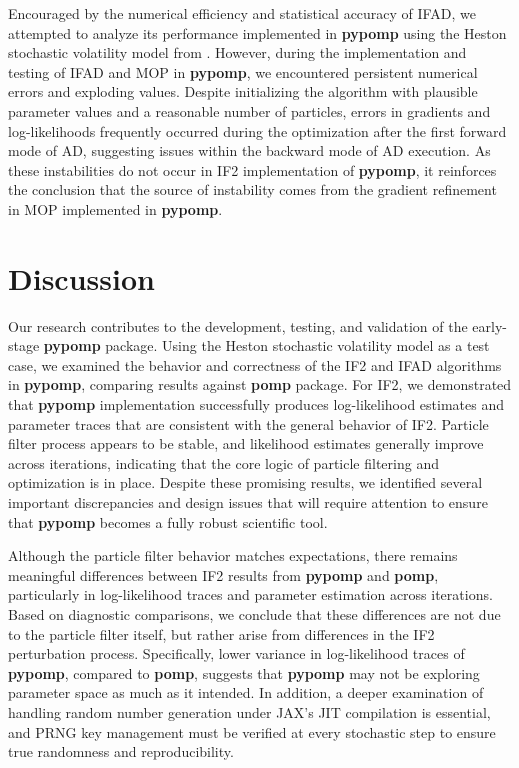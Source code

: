 \documentclass[11pt]{report}
\begin{document}
Encouraged by the numerical efficiency and statistical accuracy of IFAD, we attempted to analyze its performance implemented in \textbf{pypomp} using the Heston stochastic volatility model from \citet{sunmodel}. However, during the implementation and testing of IFAD and MOP in \textbf{pypomp}, we encountered persistent numerical errors and exploding values. Despite initializing the algorithm with plausible parameter values and a reasonable number of particles, errors in gradients and log-likelihoods frequently occurred during the optimization after the first forward mode of AD, suggesting issues within the backward mode of AD execution. As these instabilities do not occur in IF2 implementation of \textbf{pypomp}, it reinforces the conclusion that the source of instability comes from the gradient refinement in MOP implemented in \textbf{pypomp}. 


\chapter{Discussion}\label{chap:discussion}
Our research contributes to the development, testing, and validation of the early-stage \textbf{pypomp} package. Using the Heston stochastic volatility model as a test case, we examined the behavior and correctness of the IF2 and IFAD algorithms in \textbf{pypomp}, comparing results against \textbf{pomp} package.
For IF2, we demonstrated that \textbf{pypomp} implementation successfully produces log-likelihood estimates and parameter traces that are consistent with the general behavior of IF2. Particle filter process appears to be stable, and likelihood estimates generally improve across iterations, indicating that the core logic of particle filtering and optimization is in place. Despite these promising results, we identified several important discrepancies and design issues that will require attention to ensure that \textbf{pypomp} becomes a fully robust scientific tool.


Although the particle filter behavior matches expectations, there remains meaningful differences between IF2 results from \textbf{pypomp} and \textbf{pomp}, particularly in log-likelihood traces and parameter estimation across iterations. Based on diagnostic comparisons, we conclude that these differences are not due to the particle filter itself, but rather arise from differences in the IF2 perturbation process. Specifically, lower variance in log-likelihood traces of \textbf{pypomp}, compared to \textbf{pomp}, suggests that \textbf{pypomp} may not be exploring parameter space as much as it intended. In addition, a deeper examination of handling random number generation under JAX’s JIT compilation is essential, and PRNG key management must be verified at every stochastic step to ensure true randomness and reproducibility.
\end{document}
